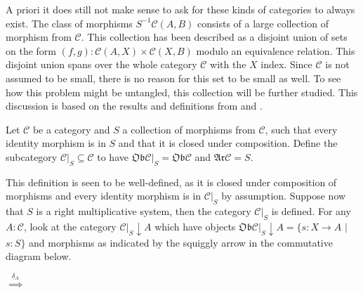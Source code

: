     A priori it does still not make sense to ask for these kinds of categories to always exist. The class of morphisms $S^{-1}\mathcal{C}(A,B)$ consists of a large collection of morphism from $\mathcal{C}$. This collection has been described as a disjoint union of sets on the form $(f,g):\mathcal{C}(A,X)\times \mathcal{C}(X,B)$ modulo an equivalence relation. This disjoint union spans over the whole category $\mathcal{C}$ with the $X$ index. Since $\mathcal{C}$ is not assumed to be small, there is no reason for this set to be small as well. To see how this problem might be untangled, this collection will be further studied. This discussion is based on the results and definitions from \cite{zisman} and \cite{weibel}.

    \begin{definition}
        Let $\mathcal{C}$ be a category and $S$ a collection of morphisms from $\mathcal{C}$, such that every identity morphism is in $S$ and that it is closed under composition. Define the subcategory $\mathcal{C}|_{S} \subseteq \mathcal{C}$ to have $\mathfrak{Ob}\mathcal{C}|_{S} = \mathfrak{Ob}\mathcal{C}$ and $\mathfrak{Ar}\mathcal{C} = S$.
    \end{definition}

    This definition is seen to be well-defined, as it is closed under composition of morphisms and every identity morphism is in $\mathcal{C}|_{S}$ by assumption. Suppose now that $S$ is a right multiplicative system, then the category $\mathcal{C}|_{S}$ is defined. For any $A:\mathcal{C}$, look at the category $\mathcal{C}|_{S}\downarrow A$ which have objects $\mathfrak{Ob}\mathcal{C}|_{S}\downarrow A = \{s : X \rightarrow A$ $|$ $s : S\}$ and morphisms as indicated by the squiggly arrow in the commutative diagram below.
    
    \begin{center}
        $\stackrel{\delta_{A}}{\implies}$
    \end{center}

